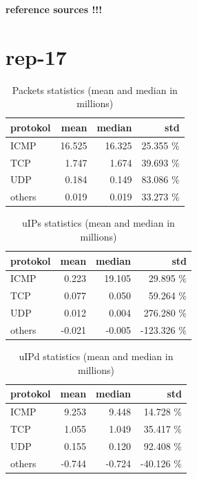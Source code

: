 \textbf{reference sources !!!}

\section*{rep-17}
\begin{table}[H]
\center
\begin{tabular}{lrrr}
\toprule
protokol & mean & median & std \\
\midrule
ICMP &   16.525  &  16.325  &  25.355 \% \\
TCP &     1.747  &   1.674  &  39.693 \% \\
UDP &     0.184  &   0.149  &  83.086 \% \\
others &  0.019  &   0.019  &  33.273 \% \\
\end{tabular}
\caption{Packets statistics (mean and median in millions)}
\label{tab:proto-stats-packets}
\end{table}

\begin{table}[H]
\center
\begin{tabular}{lrrr}
\toprule
protokol & mean & median & std \\
\midrule
ICMP &    0.223 & 19.105 &   29.895 \% \\
TCP &     0.077 &  0.050 &   59.264 \% \\
UDP &     0.012 &  0.004 &  276.280 \% \\
others & -0.021 & -0.005 & -123.326 \% \\
\end{tabular}
\caption{uIPs statistics (mean and median in millions)}
\label{tab:proto-stats-packets}
\end{table}

\begin{table}[H]
\center
\begin{tabular}{lrrr}
\toprule
protokol & mean & median & std \\
\midrule
ICMP &    9.253 &  9.448 &  14.728 \%  \\
TCP &     1.055 &  1.049 &  35.417 \%  \\
UDP &     0.155 &  0.120 &  92.408 \%  \\
others & -0.744 & -0.724 & -40.126 \%  \\
\end{tabular}
\caption{uIPd statistics (mean and median in millions)}
\label{tab:proto-stats-packets}
\end{table}

